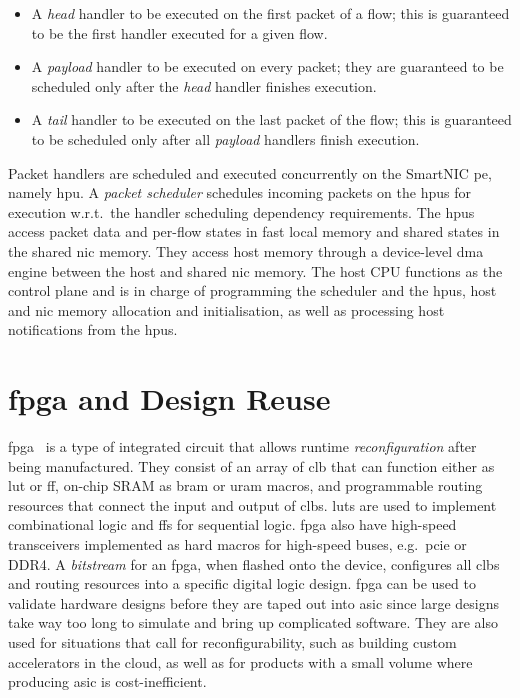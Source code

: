 \begin{itemize}
    \item A \emph{head} handler to be executed on the first packet of a flow; this is guaranteed to be the first handler executed for a given flow.
    \item A \emph{payload} handler to be executed on every packet; they are guaranteed to be scheduled only after the \emph{head} handler finishes execution.
    \item A \emph{tail} handler to be executed on the last packet of the flow; this is guaranteed to be scheduled only after all \emph{payload} handlers finish execution.
\end{itemize}

Packet handlers are scheduled and executed concurrently on the SmartNIC \ac{pe}, namely \ac{hpu}.  A \emph{packet scheduler} schedules incoming packets on the \ac{hpu}s for execution w.r.t.\ the handler scheduling dependency requirements.  The \ac{hpu}s access packet data and per-flow states in fast local memory and shared states in the shared \ac{nic} memory.  They access host memory through a device-level \ac{dma} engine between the host and shared \ac{nic} memory.  The host CPU functions as the control plane and is in charge of programming the scheduler and the \ac{hpu}s, host and \ac{nic} memory allocation and initialisation, as well as processing host notifications from the \ac{hpu}s.

\section{\Acs{fpga} and Design Reuse} \label{sec:fpga-basics}

\ac{fpga}~\cite{brown_field-programmable_1992} is a type of integrated circuit that allows runtime \emph{reconfiguration} after being manufactured.  They consist of an array of \ac{clb} that can function either as \ac{lut} or \ac{ff}, on-chip SRAM as \ac{bram} or \ac{uram} macros, and programmable routing resources that connect the input and output of \ac{clb}s.  \ac{lut}s are used to implement combinational logic and \ac{ff}s for sequential logic.  \ac{fpga} also have high-speed transceivers implemented as hard macros for high-speed buses, e.g.\ \ac{pcie} or DDR4.  A \emph{bitstream} for an \ac{fpga}, when flashed onto the device, configures all \ac{clb}s and routing resources into a specific digital logic design.  \ac{fpga} can be used to validate hardware designs before they are taped out into \ac{asic} since large designs take way too long to simulate and bring up complicated software.  They are also used for situations that call for reconfigurability, such as building custom accelerators in the cloud, as well as for products with a small volume where producing \ac{asic} is cost-inefficient.

